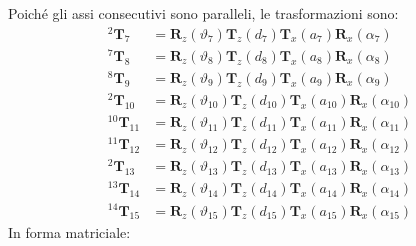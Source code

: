 Poiché gli assi consecutivi sono paralleli, le trasformazioni sono:
\begin{align*}
    {}^2\boldsymbol{T}_7&= \boldsymbol{R}_z(\vartheta_7)\boldsymbol{T}_z(d_7)\boldsymbol{T}_x(a_7)\boldsymbol{R}_x(\alpha_7) \\
    {}^7\boldsymbol{T}_8&= \boldsymbol{R}_z(\vartheta_8)\boldsymbol{T}_z(d_8)\boldsymbol{T}_x(a_8)\boldsymbol{R}_x(\alpha_8) \\
    {}^8\boldsymbol{T}_9&= \boldsymbol{R}_z(\vartheta_9)\boldsymbol{T}_z(d_9)\boldsymbol{T}_x(a_9)\boldsymbol{R}_x(\alpha_9) \\[2ex]
    {}^2\boldsymbol{T}_{10}&= \boldsymbol{R}_z(\vartheta_{10})\boldsymbol{T}_z(d_{10})\boldsymbol{T}_x(a_{10})\boldsymbol{R}_x(\alpha_{10}) \\
    {}^{10}\boldsymbol{T}_{11}&= \boldsymbol{R}_z(\vartheta_{11})\boldsymbol{T}_z(d_{11})\boldsymbol{T}_x(a_{11})\boldsymbol{R}_x(\alpha_{11}) \\
    {}^{11}\boldsymbol{T}_{12}&= \boldsymbol{R}_z(\vartheta_{12})\boldsymbol{T}_z(d_{12})\boldsymbol{T}_x(a_{12})\boldsymbol{R}_x(\alpha_{12}) \\[2ex]
    {}^2\boldsymbol{T}_{13}&= \boldsymbol{R}_z(\vartheta_{13})\boldsymbol{T}_z(d_{13})\boldsymbol{T}_x(a_{13})\boldsymbol{R}_x(\alpha_{13}) \\
    {}^{13}\boldsymbol{T}_{14}&= \boldsymbol{R}_z(\vartheta_{14})\boldsymbol{T}_z(d_{14})\boldsymbol{T}_x(a_{14})\boldsymbol{R}_x(\alpha_{14}) \\
    {}^{14}\boldsymbol{T}_{15}&= \boldsymbol{R}_z(\vartheta_{15})\boldsymbol{T}_z(d_{15})\boldsymbol{T}_x(a_{15})\boldsymbol{R}_x(\alpha_{15})
\end{align*}
In forma matriciale:
